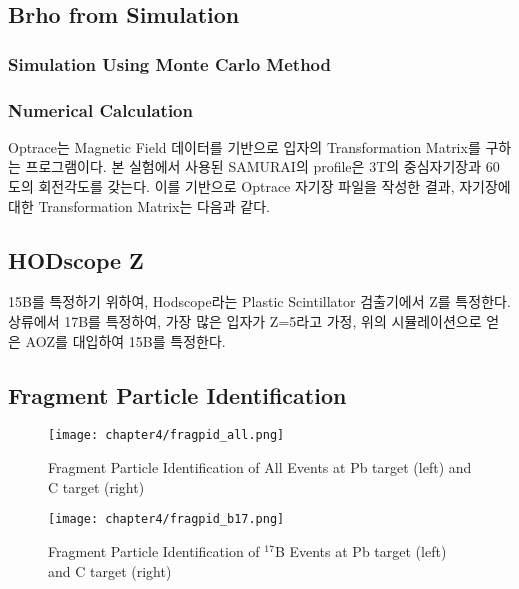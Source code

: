 \subsection{Brho from Simulation}
\subsubsection{Simulation Using Monte Carlo Method}

\subsubsection{Numerical Calculation}
Optrace는 Magnetic Field 데이터를 기반으로 입자의 Transformation Matrix를 구하는 프로그램이다. 본 실험에서 사용된 SAMURAI의 profile은 3T의 중심자기장과 60도의 회전각도를 갖는다. 이를 기반으로 Optrace 자기장 파일을 작성한 결과, 자기장에 대한 Transformation Matrix는 다음과 같다.

\subsection{HODscope Z}
15B를 특정하기 위하여, Hodscope라는 Plastic Scintillator 검출기에서 Z를 특정한다.
상류에서 17B를 특정하여, 가장 많은 입자가 Z=5라고 가정, 위의 시뮬레이션으로 얻은 AOZ를 대입하여 15B를 특정한다.
\subsection{Fragment Particle Identification}
\begin{figure}
    \centering
    \texttt{[image: chapter4/fragpid\_all.png]}
    \caption{Fragment Particle Identification of All Events at Pb target (left) and C target (right)}
    \label{Fragment Particle Identification of All Events}
\end{figure}

\begin{figure}
    \centering
    \texttt{[image: chapter4/fragpid\_b17.png]}
    \caption{Fragment Particle Identification of ${}^{17}$B Events at Pb target (left) and C target (right)}
    \label{Fragment Particle Identification of ${}^{17}$B Events}
\end{figure}

\clearpage

